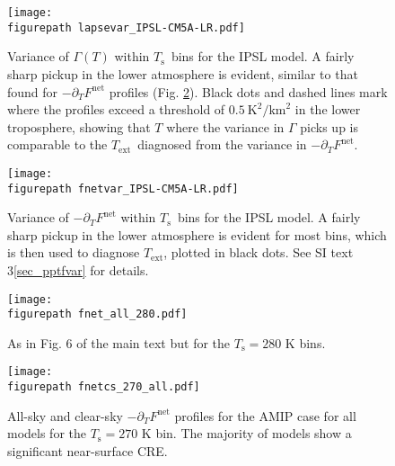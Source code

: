 \documentclass[9pt,twoside,lineno]{pnas-new}
\newcommand{\ppt}{\ensuremath{\partial_T}}
\newcommand{\Fnet}{\ensuremath{F^\mathrm{net}}}
\newcommand{\km}{\ensuremath{\mathrm{km}}}
\newcommand{\Kelvin}{\ensuremath{\mathrm{K}}}
\newcommand{\Ts}{\ensuremath{T_\mathrm{s}}}
\newcommand{\Text}{\ensuremath{T_\mathrm{ext}}}
\newcommand{\figurepath}{../../../figures_paper/}
\begin{document}
\begin{figure}[h]
        \begin{center}
                        \texttt{[image: \\figurepath lapsevar\_IPSL-CM5A-LR.pdf]}
                \caption{
                Variance of $\Gamma(T)$ within \Ts\ bins for the IPSL model. A fairly sharp pickup in the lower atmosphere is evident, similar to that found for $-\ppt \Fnet$ profiles (Fig. \ref{fnetvar_ipsl}). Black dots and dashed lines mark where the profiles exceed a threshold of $0.5\ \Kelvin^2/\km^2$ in the lower troposphere, showing that $T$ where the variance in $\Gamma$ picks up is comparable to the \Text\ diagnosed from the variance in $-\ppt \Fnet$.
                \label{lapsevar_ipsl}
                }
        \end{center}
\end{figure}

\begin{figure}[h]
        \begin{center}
                       \texttt{[image: \\figurepath fnetvar\_IPSL-CM5A-LR.pdf]}
                \caption{Variance of $-\ppt\Fnet$ within \Ts\ bins for the IPSL model. A fairly sharp pickup in the lower atmosphere is evident for most bins, which is then used to diagnose \Text, plotted in black dots. See SI text 3\ref{sec_pptfvar} for details.
                \label{fnetvar_ipsl}
                }
        \end{center}
\end{figure}

\begin{figure}[h]
        \begin{center}
                        \texttt{[image: \\figurepath fnet\_all\_280.pdf]}
                \caption{As in Fig. 6 of the main text but for the $\Ts=280$ K bins.
                                \label{fnet_all_280}
                }
        \end{center}
\end{figure}


\begin{figure}[h]
        \begin{center}
                        \texttt{[image: \\figurepath fnetcs\_270\_all.pdf]}
                \caption{All-sky and clear-sky $-\ppt\Fnet$ profiles for the AMIP case for all models for the $\Ts=270$ K bin. The majority of models show a significant near-surface CRE.
                                \label{fnetcs_270_all}
                }
        \end{center}
\end{figure}
\end{document}
